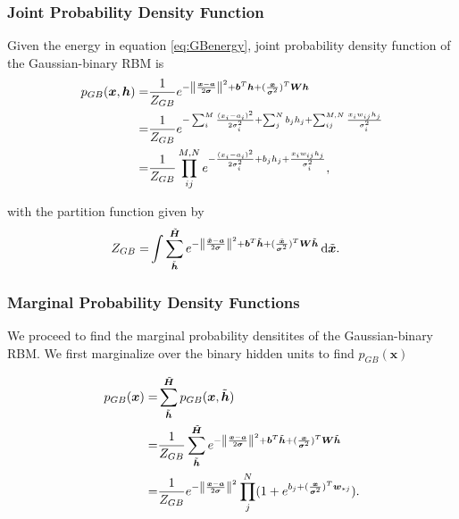 \documentclass[twoside,english]{uiofysmaster}
\newcommand*\dif{\mathop{}\!\mathrm{d}}
\DeclarePairedDelimiter{\norm}{\lVert}{\rVert}
\begin{document}

\subsubsection{Joint Probability Density Function}
Given the energy in equation \ref{eq:GBenergy}, joint probability density function of the Gaussian-binary RBM is
\begin{align}
	p_{GB} (\bm{x}, \bm{h}) =& \frac{1}{Z_{GB}} e^{-\norm*{\frac{\bm{x} -\bm{a}}{2\bm{\sigma}}}^2 + \bm{b}^T \bm{h} 
	+ (\frac{\bm{x}}{\bm{\sigma}^2})^T \bm{W}\bm{h}} \nonumber \\
	=& \frac{1}{Z_{GB}} e^{- \sum_i^M \frac{(x_i - a_i)^2}{2\sigma_i^2}
	+ \sum_j^N b_j h_j 
	+\sum_{ij}^{M,N} \frac{x_i w_{ij} h_j}{\sigma_i^2}} \nonumber \\
	=& \frac{1}{Z_{GB}} \prod_{ij}^{M,N} e^{-\frac{(x_i - a_i)^2}{2\sigma_i^2}
	+ b_j h_j 
	+\frac{x_i w_{ij} h_j}{\sigma_i^2}} ,
\end{align}

with the partition function given by
\begin{align}
	Z_{GB} =& \int \sum_{\tilde{\bm{h}}}^{\tilde{\bm{H}}} e^{-\norm*{\frac{\tilde{\bm{x}} -\bm{a}}{2\bm{\sigma}}}^2 + \bm{b}^T \tilde{\bm{h}} 
	+ (\frac{\tilde{\bm{x}}}{\bm{\sigma}^2})^T \bm{W}\tilde{\bm{h}}} \dif \tilde{\bm{x}} .
\end{align}

\subsubsection{Marginal Probability Density Functions}
We proceed to find the marginal probability densitites of the Gaussian-binary RBM. We first marginalize over the binary hidden units to find $p_{GB} (\bm{x})$

\begin{align}
	p_{GB} (\bm{x}) =& \sum_{\tilde{\bm{h}}}^{\tilde{\bm{H}}} p_{GB} (\bm{x}, \tilde{\bm{h}}) \nonumber \\
	=& \frac{1}{Z_{GB}} \sum_{\tilde{\bm{h}}}^{\tilde{\bm{H}}} 
	e^{-\norm*{\frac{\bm{x} -\bm{a}}{2\bm{\sigma}}}^2 + \bm{b}^T \tilde{\bm{h}} 
	+ (\frac{\bm{x}}{\bm{\sigma}^2})^T \bm{W}\tilde{\bm{h}}} \nonumber \\
	=& \frac{1}{Z_{GB}} e^{-\norm*{\frac{\bm{x} -\bm{a}}{2\bm{\sigma}}}^2}
	\prod_j^N (1 + e^{b_j + (\frac{\bm{x}}{\bm{\sigma}^2})^T \bm{w}_{\ast j}} ) .
\end{align}
\end{document}
